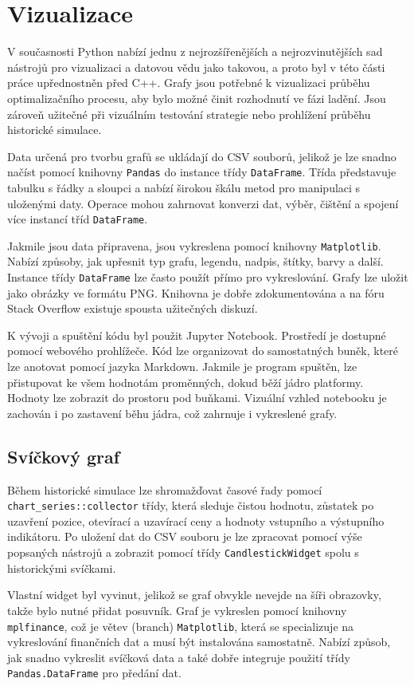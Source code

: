 \chapter{Vizualizace}
V současnosti Python nabízí jednu z nejrozšířenějších a nejrozvinutějších sad nástrojů pro vizualizaci a datovou vědu jako takovou, a proto byl v této části práce upřednostněn před C++.
Grafy jsou potřebné k vizualizaci průběhu optimalizačního procesu, aby bylo možné činit rozhodnutí ve fázi ladění.
Jsou zároveň užitečné při vizuálním testování strategie nebo prohlížení průběhu historické simulace.

Data určená pro tvorbu grafů se ukládají do CSV souborů, jelikož je lze snadno načíst pomocí knihovny \texttt{Pandas} do instance třídy \texttt{DataFrame}.
Třída představuje tabulku s řádky a sloupci a nabízí širokou škálu metod pro manipulaci s uloženými daty.
Operace mohou zahrnovat konverzi dat, výběr, čištění a spojení více instancí tříd \texttt{DataFrame}.

Jakmile jsou data připravena, jsou vykreslena pomocí knihovny \texttt{Matplotlib}.
Nabízí způsoby, jak upřesnit typ grafu, legendu, nadpis, štítky, barvy a další.
Instance třídy \texttt{DataFrame} lze často použít přímo pro vykreslování.
Grafy lze uložit jako obrázky ve formátu PNG.
Knihovna je dobře zdokumentována a na fóru Stack Overflow existuje spousta užitečných diskuzí.

K vývoji a spuštění kódu byl použit Jupyter Notebook.
Prostředí je dostupné pomocí webového prohlížeče.
Kód lze organizovat do samostatných buněk, které lze anotovat pomocí jazyka Markdown.
Jakmile je program spuštěn, lze přistupovat ke všem hodnotám proměnných, dokud běží jádro platformy.
Hodnoty lze zobrazit do prostoru pod buňkami.
Vizuální vzhled notebooku je zachován i po zastavení běhu jádra, což zahrnuje i vykreslené grafy.

\section{Svíčkový graf}
Během historické simulace lze shromažďovat časové řady pomocí \texttt{chart\_series::collector} třídy, která sleduje čistou hodnotu, zůstatek po uzavření pozice, otevírací a uzavírací ceny a hodnoty vstupního a výstupního indikátoru.
Po uložení dat do CSV souboru je lze zpracovat pomocí výše popsaných nástrojů a zobrazit pomocí třídy \texttt{CandlestickWidget} spolu s historickými svíčkami.

Vlastní widget byl vyvinut, jelikož se graf obvykle nevejde na šíři obrazovky, takže bylo nutné přidat posuvník.
Graf je vykreslen pomocí knihovny \texttt{mplfinance}, což je větev (branch) \texttt{Matplotlib}, která se specializuje na vykreslování finančních dat a musí být instalována samostatně.
Nabízí způsob, jak snadno vykreslit svíčková data a také dobře integruje použití třídy \texttt{Pandas.DataFrame} pro předání dat.

